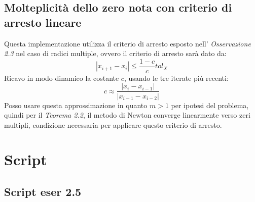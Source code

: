\subsection{Molteplicit\`a dello zero nota con criterio di arresto lineare}
\label{subsec:newtonMethodMultKnownLinearStopCriteria}
Questa implementazione utilizza il criterio di arresto esposto nell'
\emph{Osservazione 2.3} nel caso di radici multiple, ovvero il criterio di
arresto sar\`a dato da:
\begin{displaymath}
	|x_{i+1} - x_{i}| \leq \frac{1-c}{c}tol_{X}
\end{displaymath}
Ricavo in modo dinamico la costante $c$, usando le tre iterate pi\`u recenti:
\begin{displaymath}
	c \approx \frac{|x_{i} - x_{i-1}|}{|x_{i-1} - x_{i-2}|}
\end{displaymath}
Posso usare questa approssimazione in quanto $m > 1$ per ipotesi del problema,
quindi per il \emph{Teorema 2.2}, il metodo di Newton converge linearmente verso zeri
multipli, 
condizione necessaria per applicare questo criterio di arresto.


\section{Script}
\subsection{Script eser 2.5}
\label{subsec:ScriptEser25}

